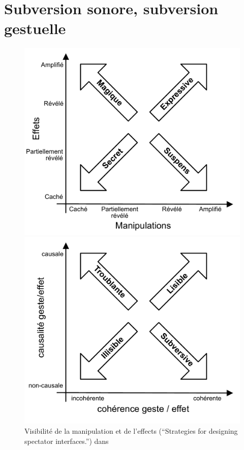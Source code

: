 \section{Subversion sonore, subversion gestuelle}
\label{sec:gesture:subversion}
\begin{figure}[!htbp]
	\captionsetup{format=plain}%
	\centering
	\begin{minipage}[t]{0.48\textwidth}
		\includegraphics[width=\linewidth]{gfx/03_gesture/ManipulationVsEffect2.pdf}
		\caption{Visibilité de la manipulation et de l'effects (``Strategies for designing spectator interfaces.'') dans \cite{reeves_designing_2005, benford_performing_2010}}
		\label{fig:gesture:Benford}
	\end{minipage}
	\hspace{.02\linewidth}
	\begin{minipage}[t]{0.48\textwidth}
	  \includegraphics[width=\linewidth]{gfx/03_gesture/CoherenceVsCausalite2.pdf}

\end{minipage}
\end{figure}
